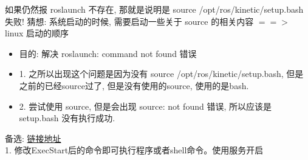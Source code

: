 如果仍然报 roslaunch 不存在, 那就是说明是 source /opt/ros/kinetic/setup.bash 失败!
猜想: 系统启动的时候, 需要启动一些关于 source 的相关内容 $==>$ linux 启动的顺序

\begin{itemize}
    \item 目的: 解决 roslaunch: command not found 错误
    \item 1. 之所以出现这个问题是因为没有 source /opt/ros/kinetic/setup.bash, 但是之前的已经source过了, 但是没有使用的source, 使用的是bash. 
    \item 2. 尝试使用 source, 但是会出现 source: not found 错误, 所以应该是 setup.bash 没有执行成功. 
\end{itemize}


备选: \href{https://www.jianshu.com/p/4f62da66ffc1}{链接地址}\\
1. 修改ExecStart后的命令即可执行程序或者shell命令。使用服务开启